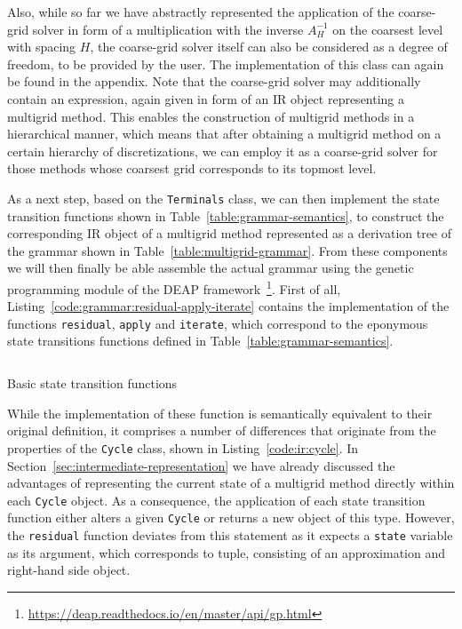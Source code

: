 Also, while so far we have abstractly represented the application of the coarse-grid solver in form of a multiplication with the inverse $A^{-1}_H$ on the coarsest level with spacing $H$, the coarse-grid solver itself can also be considered as a degree of freedom, to be provided by the user.
The implementation of this class can again be found in the appendix.
Note that the coarse-grid solver may additionally contain an expression, again given in form of an IR object representing a multigrid method.
This enables the construction of multigrid methods in a hierarchical manner, which means that after obtaining a multigrid method on a certain hierarchy of discretizations, we can employ it as a coarse-grid solver for those methods whose coarsest grid corresponds to its topmost level.

As a next step, based on the \texttt{Terminals} class, we can then implement the state transition functions shown in Table~\ref{table:grammar-semantics}, to construct the corresponding IR object of a multigrid method represented as a derivation tree of the grammar shown in Table~\ref{table:multigrid-grammar}.
From these components we will then finally be able assemble the actual grammar using the genetic programming module of the DEAP framework~\footnote{\url{https://deap.readthedocs.io/en/master/api/gp.html}}.
First of all, Listing~\ref{code:grammar:residual-apply-iterate} contains the implementation of the functions \texttt{residual}, \texttt{apply} and \texttt{iterate}, which correspond to the eponymous state transitions functions defined in Table~\ref{table:grammar-semantics}.
\begin{listing}
	\inputminted{python}{evostencils/grammar/residual_apply_iterate.py}
	\caption{Basic state transition functions}
	\label{code:grammar:residual-apply-iterate}
\end{listing}
While the implementation of these function is semantically equivalent to their original definition, it comprises a number of differences that originate from the properties of the \texttt{Cycle} class, shown in Listing~\ref{code:ir:cycle}.
In Section~\ref{sec:intermediate-representation} we have already discussed the advantages of representing the current state of a multigrid method directly within each \texttt{Cycle} object.
As a consequence, the application of each state transition function either alters a given \texttt{Cycle} or returns a new object of this type.
However, the \texttt{residual} function deviates from this statement as it expects a \texttt{state} variable as its argument, which corresponds to tuple, consisting of an approximation and right-hand side object.
